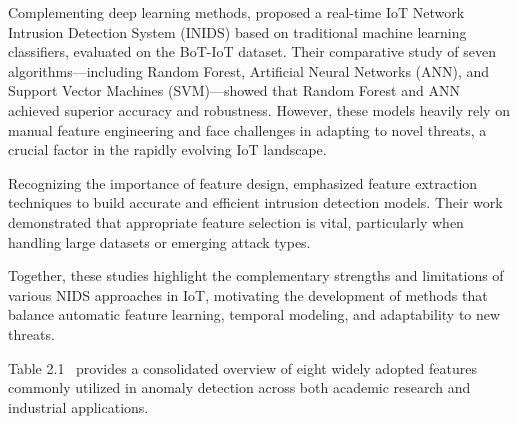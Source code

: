 \begin{ZhChapter}
    Complementing deep learning methods, \citeauthor{ashraf2025making} \cite{ashraf2025making} proposed a real-time IoT Network Intrusion Detection System (INIDS) based on traditional machine learning classifiers, evaluated on the BoT-IoT dataset. Their comparative study of seven algorithms—including Random Forest, Artificial Neural Networks (ANN), and Support Vector Machines (SVM)—showed that Random Forest and ANN achieved superior accuracy and robustness. However, these models heavily rely on manual feature engineering and face challenges in adapting to novel threats, a crucial factor in the rapidly evolving IoT landscape.

    Recognizing the importance of feature design, \citeauthor{lee2000framework} \cite{lee2000framework} emphasized feature extraction techniques to build accurate and efficient intrusion detection models. Their work demonstrated that appropriate feature selection is vital, particularly when handling large datasets or emerging attack types.

    Together, these studies highlight the complementary strengths and limitations of various NIDS approaches in IoT, motivating the development of methods that balance automatic feature learning, temporal modeling, and adaptability to new threats.


    Table 2.1~\cite{geeksforgeeks} provides a consolidated overview of eight widely adopted features commonly utilized in anomaly detection across both academic research and industrial applications.



\end{ZhChapter}
